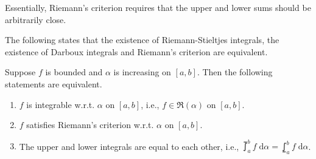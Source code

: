 \documentclass[thmcnt=section, 12pt]{my-elegantbook}
\begin{document}
Essentially, Riemann's criterion requires that the upper and lower sums should be arbitrarily close.


The following states that the existence of Riemann-Stieltjes integrals, the existence of Darboux integrals and Riemann's criterion are equivalent.

\begin{theorem} \label{thm:28}
    Suppose $f$ is bounded and $\alpha$ is increasing on $[a, b]$. Then the following statements are equivalent.
    \begin{enumerate}
        \item $f$ is integrable w.r.t. $\alpha$ on $[a, b]$, i.e., $f \in \mathfrak{R}(\alpha)$ on $[a, b]$.
        \item $f$ satisfies Riemann's criterion w.r.t. $\alpha$ on $[a, b]$.
        \item The upper and lower integrals are equal to each other, i.e., $\upint_a^b f \; \mathrm{d}\alpha = \lowint_a^b f \; \mathrm{d}\alpha$.
    \end{enumerate}
\end{theorem}
\end{document}
